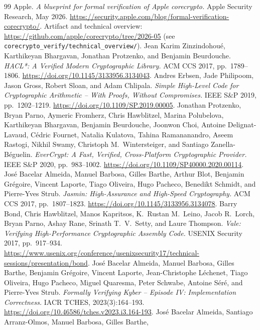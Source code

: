 \documentclass[11pt]{article}
\begin{document}
\begin{thebibliography}{99}
 Apple. \emph{A blueprint for formal verification of Apple corecrypto.}
  Apple Security Research, May 2026. \url{https://security.apple.com/blog/formal-verification-corecrypto/}.
  Artifact and technical overview: \url{https://github.com/apple/corecrypto/tree/2026-05}
  (see \texttt{corecrypto\_verify/technical\_overview/}).
 Jean Karim Zinzindohou\'e, Karthikeyan Bhargavan, Jonathan Protzenko, and Benjamin
  Beurdouche. \emph{HACL*: A Verified Modern Cryptographic Library.} ACM CCS 2017, pp.\ 1789--1806.
  \url{https://doi.org/10.1145/3133956.3134043}.
 Andres Erbsen, Jade Philipoom, Jason Gross, Robert Sloan, and Adam Chlipala.
  \emph{Simple High-Level Code for Cryptographic Arithmetic -- With Proofs, Without Compromises.}
  IEEE S\&P 2019, pp.\ 1202--1219. \url{https://doi.org/10.1109/SP.2019.00005}.
 Jonathan Protzenko, Bryan Parno, Aymeric Fromherz, Chris Hawblitzel, Marina
  Polubelova, Karthikeyan Bhargavan, Benjamin Beurdouche, Joonwon Choi, Antoine Delignat-Lavaud,
  C\'edric Fournet, Natalia Kulatova, Tahina Ramananandro, Aseem Rastogi, Nikhil Swamy, Christoph
  M.\ Wintersteiger, and Santiago Zanella-B\'eguelin. \emph{EverCrypt: A Fast, Verified,
  Cross-Platform Cryptographic Provider.} IEEE S\&P 2020, pp.\ 983--1002.
  \url{https://doi.org/10.1109/SP40000.2020.00114}.
 Jos\'e Bacelar Almeida, Manuel Barbosa, Gilles Barthe, Arthur Blot, Benjamin
  Gr\'egoire, Vincent Laporte, Tiago Oliveira, Hugo Pacheco, Benedikt Schmidt, and Pierre-Yves Strub.
  \emph{Jasmin: High-Assurance and High-Speed Cryptography.} ACM CCS 2017, pp.\ 1807--1823.
  \url{https://doi.org/10.1145/3133956.3134078}.
 Barry Bond, Chris Hawblitzel, Manos Kapritsos, K.\ Rustan M.\ Leino, Jacob R.\ Lorch,
  Bryan Parno, Ashay Rane, Srinath T.\ V.\ Setty, and Laure Thompson. \emph{Vale: Verifying
  High-Performance Cryptographic Assembly Code.} USENIX Security 2017, pp.\ 917--934.
  \url{https://www.usenix.org/conference/usenixsecurity17/technical-sessions/presentation/bond}.
 Jos\'e Bacelar Almeida, Manuel Barbosa, Gilles Barthe, Benjamin Gr\'egoire,
  Vincent Laporte, Jean-Christophe L\'echenet, Tiago Oliveira, Hugo Pacheco, Miguel Quaresma, Peter
  Schwabe, Antoine S\'er\'e, and Pierre-Yves Strub. \emph{Formally Verifying Kyber -- Episode IV:
  Implementation Correctness.} IACR TCHES, 2023(3):164--193.
  \url{https://doi.org/10.46586/tches.v2023.i3.164-193}.
 Jos\'e Bacelar Almeida, Santiago Arranz-Olmos, Manuel Barbosa, Gilles Barthe,

\end{thebibliography}
\end{document}
